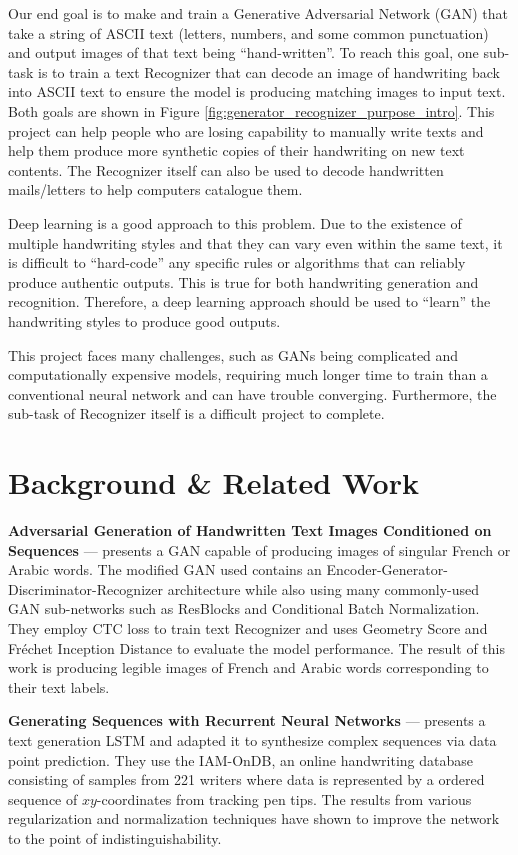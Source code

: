 \documentclass{article} %
\begin{document}
Our end goal is to make and train a Generative Adversarial Network (GAN) that take a string of ASCII text (letters, numbers, and some common punctuation) and output images of that text being ``hand-written''. To reach this goal, one sub-task is to train a text Recognizer that can decode an image of handwriting back into ASCII text to ensure the model is producing matching images to input text. Both goals are shown in Figure \ref{fig:generator_recognizer_purpose_intro}. This project can help people who are losing capability to manually write texts and help them produce more synthetic copies of their handwriting on new text contents. The Recognizer itself can also be used to decode handwritten mails/letters to help computers catalogue them.

Deep learning is a good approach to this problem. Due to the existence of multiple handwriting styles and that they can vary even within the same text, it is difficult to ``hard-code'' any specific rules or algorithms that can reliably produce authentic outputs. This is true for both handwriting generation and recognition. Therefore, a deep learning approach should be used to ``learn'' the handwriting styles to produce good outputs.

This project faces many challenges, such as GANs being complicated and computationally expensive models, requiring much longer time to train than a conventional neural network and can have trouble converging. Furthermore, the sub-task of Recognizer itself is a difficult project to complete.

\section{Background \& Related Work}

 {\bf Adversarial Generation of Handwritten Text Images Conditioned on Sequences} --- \citep{handwritingGANGeneration} presents a GAN capable of producing images of singular French or Arabic words. The modified GAN used contains an Encoder-Generator-Discriminator-Recognizer architecture while also using many commonly-used GAN sub-networks such as ResBlocks and Conditional Batch Normalization. They employ CTC loss to train text Recognizer and uses Geometry Score and Fréchet Inception Distance to evaluate the model performance. The result of this work is producing legible images of French and Arabic words corresponding to their text labels.

    {\bf Generating Sequences with Recurrent Neural Networks} --- \citep{graves2014generating} presents a text generation LSTM and adapted it to synthesize complex sequences via data point prediction. They use the IAM-OnDB, an online handwriting database \citep{IAMHandwritingDatabaseOnline} consisting of samples from 221 writers where data is represented by a ordered sequence of $xy$-coordinates from tracking pen tips. The results from various regularization and normalization techniques have shown to improve the network to the point of indistinguishability.
\end{document}
